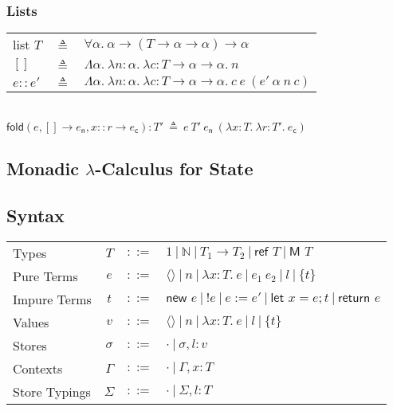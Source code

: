 \documentclass{article}
\begin{document}
\subsubsection*{Lists}

\hspace{-1em}
\begin{tabular}{lcl}
\textsf{list }$T$ & \hspace{-0.5em}$\triangleq$ & \hspace{-0.5em}$\forall\alpha.\ \alpha\to(T\to\alpha\to\alpha)\to\alpha$\\[0.5em]
$[]$ & \hspace{-0.5em}$\triangleq$ & \hspace{-0.5em}$\Lambda\alpha.\ \lambda n:\alpha.\ \lambda c:T\to\alpha\to\alpha.\ n$\\[0.5em]
$e::e'$ & \hspace{-0.5em}$\triangleq$ & \hspace{-0.5em}$\Lambda\alpha.\ \lambda n:\alpha.\ \lambda c:T\to\alpha\to\alpha.\ c\ e\ (e'\ \alpha\ n\ c)$\\[0.5em]
\end{tabular}\\
$\textsf{fold}(e,[]\to e_\textsf{n},x::r\to e_\textsf{c}):T'\ \triangleq\ e\ T'\ e_\textsf{n}\ (\lambda x:T.\ \lambda r:T'.\ e_\textsf{c})$

\newpage

\subsection{Monadic $\lambda$-Calculus for State}

\subsection*{Syntax}

\hspace{-1em}
\begin{tabular}{lccl}
Types          & $T$ & $::=$ & $1\ |\ \mathbb{N}\ |\ T_1\to T_2\ |\ \textsf{ref }T\ |\ \textsf{M }T$\\[0.5em]
Pure Terms     & $e$ & $::=$ & $\langle\rangle\ |\ n\ |\ \lambda x:T.\ e\ |\ e_1\ e_2\ |\ l\ |\ \{t\}$\\[0.5em]
Impure Terms   & $t$ & $::=$ & $\textsf{new }e\ |\ !e\ |\ e:=e'\ |\ \textsf{let }x=e;t\ |\ \textsf{return }e$\\[0.5em]
Values         & $v$ & $::=$ & $\langle\rangle\ |\ n\ |\ \lambda x:T.\ e\ |\ l\ |\ \{t\}$\\[0.5em]
Stores         & $\sigma$ & $::=$ & $\cdot\ |\ \sigma,l:v$\\[0.5em]
Contexts       & $\Gamma$ & $::=$ & $\cdot\ |\ \Gamma,x:T$\\[0.5em]
Store Typings  & $\Sigma$ & $::=$ & $\cdot\ |\ \Sigma,l:T$ 
\end{tabular} 
\end{document}
